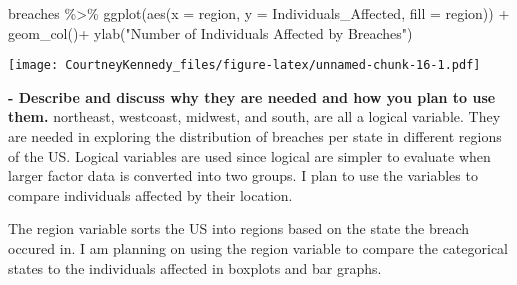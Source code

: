\documentclass[
]{article}
\newenvironment{Shaded}{\begin{snugshade}}{\end{snugshade}}
\newcommand{\AttributeTok}[1]{\textcolor[rgb]{0.77,0.63,0.00}{#1}}
\newcommand{\FunctionTok}[1]{\textcolor[rgb]{0.00,0.00,0.00}{#1}}
\newcommand{\NormalTok}[1]{#1}
\newcommand{\SpecialCharTok}[1]{\textcolor[rgb]{0.00,0.00,0.00}{#1}}
\newcommand{\StringTok}[1]{\textcolor[rgb]{0.31,0.60,0.02}{#1}}
\begin{document}
\begin{Shaded}
\begin{Highlighting}[]
\NormalTok{breaches }\SpecialCharTok{\%\textgreater{}\%}
  \FunctionTok{ggplot}\NormalTok{(}\FunctionTok{aes}\NormalTok{(}\AttributeTok{x =}\NormalTok{ region, }\AttributeTok{y =}\NormalTok{ Individuals\_Affected, }\AttributeTok{fill =}\NormalTok{ region)) }\SpecialCharTok{+}
  \FunctionTok{geom\_col}\NormalTok{()}\SpecialCharTok{+}
  \FunctionTok{ylab}\NormalTok{(}\StringTok{"Number of Individuals Affected by Breaches"}\NormalTok{)}
\end{Highlighting}
\end{Shaded}

\texttt{[image: CourtneyKennedy\_files/figure-latex/unnamed-chunk-16-1.pdf]}

\textbf{- Describe and discuss why they are needed and how you plan to
use them.} northeast, westcoast, midwest, and south, are all a logical
variable. They are needed in exploring the distribution of breaches per
state in different regions of the US. Logical variables are used since
logical are simpler to evaluate when larger factor data is converted
into two groups. I plan to use the variables to compare individuals
affected by their location.

The region variable sorts the US into regions based on the state the
breach occured in. I am planning on using the region variable to compare
the categorical states to the individuals affected in boxplots and bar
graphs.
\end{document}
